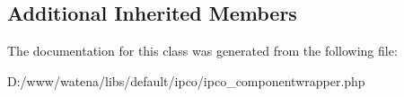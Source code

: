 \subsection*{Additional Inherited Members}


The documentation for this class was generated from the following file\-:\begin{DoxyCompactItemize}
\item 
D\-:/www/watena/libs/default/ipco/ipco\-\_\-componentwrapper.\-php\end{DoxyCompactItemize}
